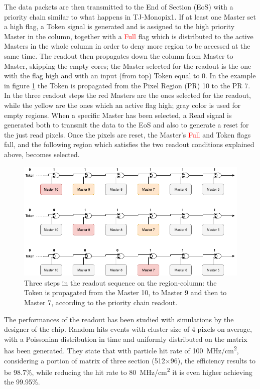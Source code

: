         The data packets are then transmitted to the End of Section (EoS) with a priority chain similar to what happens in TJ-Monopix1. 
        If at least one Master set a high flag, a \textcolor{Cerulean}{Token} signal is generated and is assigned to the high priority Master in the column, together with a \textcolor{red}{Full} flag which is distributed to the active Masters in the whole column in order to deny more region to be accessed at the same time.
        The readout then propagates down the column from Master to Master, skipping the empty cores; the Master selected for the readout is the one with the flag high and with an input (from top) \textcolor{Cerulean}{Token} equal to 0. 
        In the example in figure \ref{fig:token_chain} the \textcolor{Cerulean}{Token} is propagated from the Pixel Region (PR) 10 to the PR 7. 
        In the three readout steps the red Masters are the ones selected for the readout, while the yellow are the ones which an active flag high; gray color is used for empty regions. When a specific Master has been selected, a \textcolor{Cerulean}{Read} signal is generated both to transmit the data to the EoS and also to generate a reset for the just read pixels.
        Once the pixels are reset, the Master's \textcolor{red}{Full} 
        and \textcolor{Cerulean}{Token} flags fall, and the following region which satisfies the two readout conditions explained above, becomes selected. 
        \begin{figure}[h!]
            \centering
            \includegraphics[width=.75\linewidth]{figures/ARCADIA/token_chain.png}
            \caption{Three steps in the readout sequence on the region-column: the Token is propagated from the Master 10, to Master 9 and then to Master 7, according to the priority chain readout.}
            \label{fig:token_chain}
        \end{figure}

    The performances of the readout has been studied with simulations by the designer of the chip. 
    Random hits events with cluster size of 4 pixels on average, with a Poissonian distribution in time and uniformly distributed on the matrix has been generated.
    They state that with particle hit rate of \SI{100}{MHz/cm\squared}, considering a portion of matrix of three section (512$\times$96), the efficiency results to be 98.7\%, while reducing the hit rate to \SI{80}{MHz/cm\squared} it is even higher achieving the 99.95\%. 
